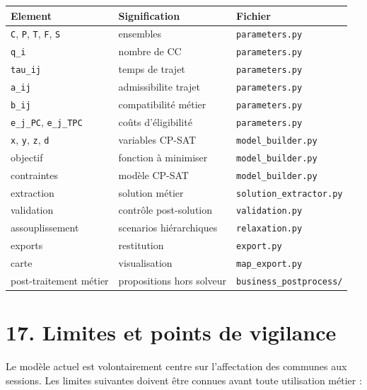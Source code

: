 \documentclass[11pt,a4paper]{article}
\begin{document}
\begin{longtable}{|L{0.24\textwidth}|L{0.18\textwidth}|L{0.48\textwidth}|}
\hline
Element & Signification & Fichier \\
\hline
\endhead
\texttt{C}, \texttt{P}, \texttt{T}, \texttt{F}, \texttt{S} & ensembles & \texttt{parameters.py} \\
\hline
\texttt{q\_i} & nombre de CC & \texttt{parameters.py} \\
\hline
\texttt{tau\_ij} & temps de trajet & \texttt{parameters.py} \\
\hline
\texttt{a\_ij} & admissibilite trajet & \texttt{parameters.py} \\
\hline
\texttt{b\_ij} & compatibilité métier & \texttt{parameters.py} \\
\hline
\texttt{e\_j\_PC}, \texttt{e\_j\_TPC} & coûts d'éligibilité & \texttt{parameters.py} \\
\hline
\texttt{x}, \texttt{y}, \texttt{z}, \texttt{d} & variables CP-SAT & \texttt{model\_builder.py} \\
\hline
objectif & fonction à minimiser & \texttt{model\_builder.py} \\
\hline
contraintes & modèle CP-SAT & \texttt{model\_builder.py} \\
\hline
extraction & solution métier & \texttt{solution\_extractor.py} \\
\hline
validation & contrôle post-solution & \texttt{validation.py} \\
\hline
assouplissement & scenarios hiérarchiques & \texttt{relaxation.py} \\
\hline
exports & restitution & \texttt{export.py} \\
\hline
carte & visualisation & \texttt{map\_export.py} \\
\hline
post-traitement métier & propositions hors solveur & \texttt{business\_postprocess/} \\
\hline
\end{longtable}

\section{17. Limites et points de vigilance}

Le modèle actuel est volontairement centre sur l'affectation des communes aux sessions. Les limites suivantes doivent être connues avant toute utilisation métier :
\end{document}
